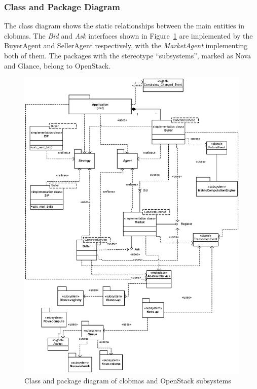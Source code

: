 \documentclass[10pt,journal,compsoc]{IEEEtran}
\begin{document}
\subsubsection{Class and Package Diagram} The class diagram shows the static relationships between the main entities in clobmas. The \textit{Bid} and \textit{Ask} interfaces shown in Figure~\ref{fig:package_diagram} are implemented by the BuyerAgent and SellerAgent respectively, with the \textit{MarketAgent} implementing both of them. The packages with the stereotype ``subsystems'', marked as Nova and Glance, belong to OpenStack.


\begin{figure}[htbp]
\centering
\includegraphics[scale=0.75]{Figure4.eps}
\caption{Class and package diagram of clobmas and OpenStack subsystems\label{fig:package_diagram}}
\end{figure}
\end{document}
